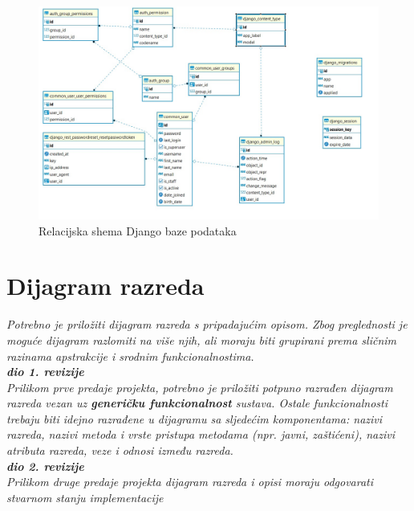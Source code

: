 			
			\begin{figure}[H]
				\includegraphics[scale=0.35]{slike/djangoBaza.jpeg} %
				\centering
				\caption{Relacijska shema Django baze podataka}
				\label{fig:promjene}
			\end{figure}
			\eject
			
			
		\section{Dijagram razreda}
		
			\textit{Potrebno je priložiti dijagram razreda s pripadajućim opisom. Zbog preglednosti je moguće dijagram razlomiti na više njih, ali moraju biti grupirani prema sličnim razinama apstrakcije i srodnim funkcionalnostima.}\\
			
			\textbf{\textit{dio 1. revizije}}\\
			
			\textit{Prilikom prve predaje projekta, potrebno je priložiti potpuno razrađen dijagram razreda vezan uz \textbf{generičku funkcionalnost} sustava. Ostale funkcionalnosti trebaju biti idejno razrađene u dijagramu sa sljedećim komponentama: nazivi razreda, nazivi metoda i vrste pristupa metodama (npr. javni, zaštićeni), nazivi atributa razreda, veze i odnosi između razreda.}\\
			
			\textbf{\textit{dio 2. revizije}}\\			
			
			\textit{Prilikom druge predaje projekta dijagram razreda i opisi moraju odgovarati stvarnom stanju implementacije}
			
